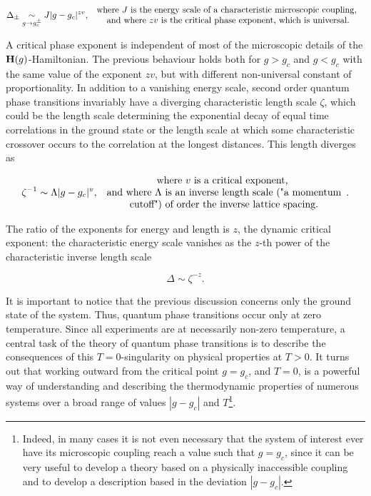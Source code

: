 $$
    \Delta_{\pm} \underset{g \rightarrow g_c^{\pm}}{\sim} J |g-g_c|^{zv},  \begin{array}{c}
         \textnormal{ where $J$ is the energy scale of a characteristic microscopic coupling, }  \\
         \textnormal{ and where $zv$ is the critical phase exponent, which is universal.} 
    \end{array}
$$

A critical phase exponent is independent of most of the microscopic details of the ${\bf H}(g)$-Hamiltonian. The previous behaviour holds both for $g > g_c$ and $g < g_c$ with the same value of the exponent $zv$, but with different non-universal constant of proportionality. In addition to a vanishing energy scale, second order quantum phase transitions invariably have a diverging characteristic length scale $\zeta$, which could be the length scale determining the exponential decay of equal time correlations in the ground state or the length scale at which some characteristic crossover occurs to the correlation at the longest distances. This length diverges as 

$$
\zeta^{-1} \sim \Lambda |g-g_c|^{v}, \begin{array}{c}
         \textnormal{ where $v$ is a critical exponent, }  \\
         \textnormal{ and where $\Lambda$ is an inverse length scale ("a momentum}\\\textnormal{ cutoff") of order the inverse lattice spacing.} 
    \end{array}.
$$

The ratio of the exponents for energy and length is $z$, the dynamic critical exponent: the characteristic energy scale vanishes as the $z$-th power of the characteristic inverse length scale 

$$
    \Delta \sim \zeta^{-z}.
$$

It is important to notice that the previous discussion concerns only the ground state of the system. Thus, quantum phase transitions occur only at zero temperature. Since all experiments are at necessarily non-zero temperature, a central task of the theory of quantum phase transitions is to describe the consequences of this $T=0$-singularity on physical properties at $T > 0$. It turns out that working outward from the critical point $g = g_c$, and $T=0$, is a powerful way of understanding and describing the thermodynamic properties of numerous systems over a broad range of values $|g-g_c|$ and $T$\footnote{Indeed, in many cases it is not even necessary that the system of interest ever have its microscopic coupling reach a value such that $g=g_c$, since it can be very useful to develop a theory based on a physically inaccessible coupling and to develop a description based in the deviation $|g- g_c|.$}. \\

